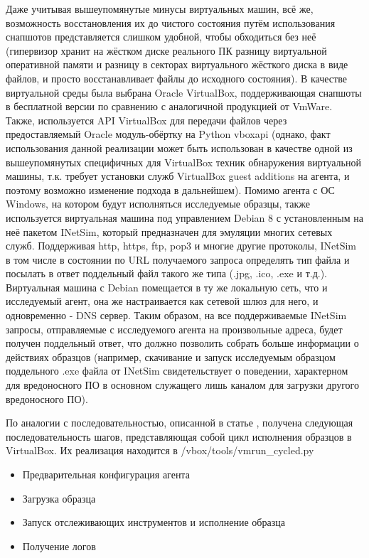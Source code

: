 Даже учитывая вышеупомянутые минусы виртуальных машин, всё же, возможность восстановления их до чистого состояния путём использования снапшотов представляется слишком удобной, чтобы обходиться без неё (гипервизор хранит на жёстком диске реального ПК разницу виртуальной оперативной памяти и разницу в секторах виртуального жёсткого диска в виде файлов, и просто восстанавливает файлы до исходного состояния). В качестве виртуальной среды была выбрана Oracle VirtualBox, поддерживающая снапшоты в бесплатной версии по сравнению с аналогичной продукцией от VmWare. Также, используется API VirtualBox для передачи файлов через предоставляемый Oracle модуль-обёртку на Python vboxapi (однако, факт использования данной реализации может быть использован в качестве одной из вышеупомянутых специфичных для VirtualBox техник обнаружения виртуальной машины, т.к. требует установки служб VirtualBox guest additions на агента, и поэтому возможно изменение подхода в дальнейшем). Помимо агента с ОС Windows, на котором будут исполняться исследуемые образцы, также используется виртуальная машина под управлением Debian 8 с установленным на неё пакетом INetSim, который предназначен для эмуляции многих сетевых служб. Поддерживая http, https, ftp, pop3 и многие другие протоколы, INetSim в том числе в состоянии по URL получаемого запроса определять тип файла и посылать в ответ поддельный файл такого же типа (.jpg, .ico, .exe и т.д.). Виртуальная машина с Debian помещается в ту же локальную сеть, что и  исследуемый агент, она же настраивается как сетевой шлюз для него, и одновременно - DNS сервер. Таким образом, на все поддерживаемые INetSim запросы, отправляемые с исследуемого агента на произвольные адреса, будет получен поддельный ответ, что должно позволить собрать больше информации о действиях образцов (например, скачивание и запуск исследуемым образцом поддельного .exe файла от INetSim свидетельствует о поведении, характерном для вредоносного ПО в основном служащего лишь каналом для загрузки другого вредоносного ПО).

По аналогии с последовательностью, описанной в статье \cite {MASSMALWARE}, получена следующая последовательность шагов, представляющая собой цикл исполнения образцов в VirtualBox. Их реализация находится в /vbox/tools/vmrun\_cycled.py

\begin {itemize}
	\item Предварительная конфигурация агента
	\item Загрузка образца
	\item Запуск отслеживающих инструментов и исполнение образца
	\item Получение логов
\end {itemize}


